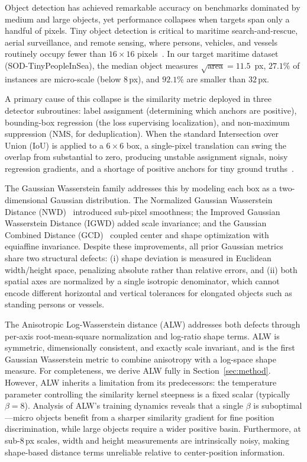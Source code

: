 \documentclass[runningheads]{llncs}
\begin{document}
Object detection has achieved remarkable accuracy on benchmarks dominated by
medium and large objects, yet performance collapses when targets span only a
handful of pixels. Tiny object detection is critical to maritime
search-and-rescue, aerial surveillance, and remote sensing, where persons,
vehicles, and vessels routinely occupy fewer than $16\times16$
pixels~\cite{yu2020tinyperson,wang2021aitod}. In our target maritime dataset
(SOD-TinyPeopleInSea), the median object measures $\sqrt{\text{area}}=11.5$\
px, $27.1\%$ of instances are micro-scale (below $8$\,px), and $92.1\%$ are
smaller than $32$\,px.

A primary cause of this collapse is the similarity metric deployed in three
detector subroutines: label assignment (determining which anchors are
positive), bounding-box regression (the loss supervising localization), and
non-maximum suppression (NMS, for deduplication). When the standard
Intersection over Union (IoU) is applied to a $6\times6$ box, a
single-pixel translation can swing the overlap from substantial to zero,
producing unstable assignment signals, noisy regression gradients, and a
shortage of positive anchors for tiny ground
truths~\cite{wang2021nwd,xu2022rfla}.

The Gaussian Wasserstein family addresses this by modeling each box as a
two-dimensional Gaussian distribution. The Normalized Gaussian Wasserstein
Distance (NWD)~\cite{wang2021nwd} introduced sub-pixel smoothness; the
Improved Gaussian Wasserstein Distance (IGWD) added scale invariance; and
the Gaussian Combined Distance (GCD)~\cite{guan2025gcd} coupled center and
shape optimization with equiaffine invariance. Despite these improvements,
all prior Gaussian metrics share two structural defects: (i) shape deviation
is measured in Euclidean width/height space, penalizing absolute rather than
relative errors, and (ii) both spatial axes are normalized by a single
isotropic denominator, which cannot encode different horizontal and vertical
tolerances for elongated objects such as standing persons or vessels.

The Anisotropic Log-Wasserstein distance (ALW) addresses both defects through
per-axis root-mean-square normalization and log-ratio shape terms. ALW is
symmetric, dimensionally consistent, and exactly scale invariant, and is the
first Gaussian Wasserstein metric to combine anisotropy with a log-space
shape measure. For completeness, we derive ALW fully in
Section~\ref{sec:method}. However, ALW inherits a limitation from its
predecessors: the temperature parameter controlling the similarity kernel
steepness is a fixed scalar (typically $\beta=8$). Analysis of ALW's training
dynamics reveals that a single $\beta$ is suboptimal—micro objects benefit
from a sharper similarity gradient for fine position discrimination, while
large objects require a wider positive basin. Furthermore, at sub-$8$\,px
scales, width and height measurements are intrinsically noisy, making
shape-based distance terms unreliable relative to center-position
information.
\end{document}
